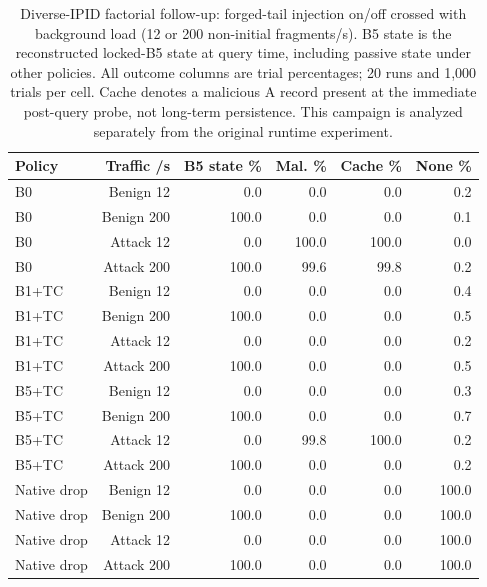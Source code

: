 \begin{table}[t]
\centering
\caption{Diverse-IPID factorial follow-up: forged-tail injection on/off crossed with background load (12 or 200 non-initial fragments/s). B5 state is the reconstructed locked-B5 state at query time, including passive state under other policies. All outcome columns are trial percentages; 20 runs and 1,000 trials per cell. Cache denotes a malicious A record present at the immediate post-query probe, not long-term persistence. This campaign is analyzed separately from the original runtime experiment.}
\label{tab:runtime-factorial}
\begingroup\fontsize{9}{10.8}\selectfont
\setlength{\tabcolsep}{3pt}
\begin{tabular}{lrrrrr}
\hline
Policy & Traffic /s & B5 state \% & Mal. \% & Cache \% & None \% \\
\hline
B0 & Benign 12 & 0.0 & 0.0 & 0.0 & 0.2 \\
B0 & Benign 200 & 100.0 & 0.0 & 0.0 & 0.1 \\
B0 & Attack 12 & 0.0 & 100.0 & 100.0 & 0.0 \\
B0 & Attack 200 & 100.0 & 99.6 & 99.8 & 0.2 \\
B1+TC & Benign 12 & 0.0 & 0.0 & 0.0 & 0.4 \\
B1+TC & Benign 200 & 100.0 & 0.0 & 0.0 & 0.5 \\
B1+TC & Attack 12 & 0.0 & 0.0 & 0.0 & 0.2 \\
B1+TC & Attack 200 & 100.0 & 0.0 & 0.0 & 0.5 \\
B5+TC & Benign 12 & 0.0 & 0.0 & 0.0 & 0.3 \\
B5+TC & Benign 200 & 100.0 & 0.0 & 0.0 & 0.7 \\
B5+TC & Attack 12 & 0.0 & 99.8 & 100.0 & 0.2 \\
B5+TC & Attack 200 & 100.0 & 0.0 & 0.0 & 0.2 \\
Native drop & Benign 12 & 0.0 & 0.0 & 0.0 & 100.0 \\
Native drop & Benign 200 & 100.0 & 0.0 & 0.0 & 100.0 \\
Native drop & Attack 12 & 0.0 & 0.0 & 0.0 & 100.0 \\
Native drop & Attack 200 & 100.0 & 0.0 & 0.0 & 100.0 \\
\hline
\end{tabular}
\endgroup
\end{table}

